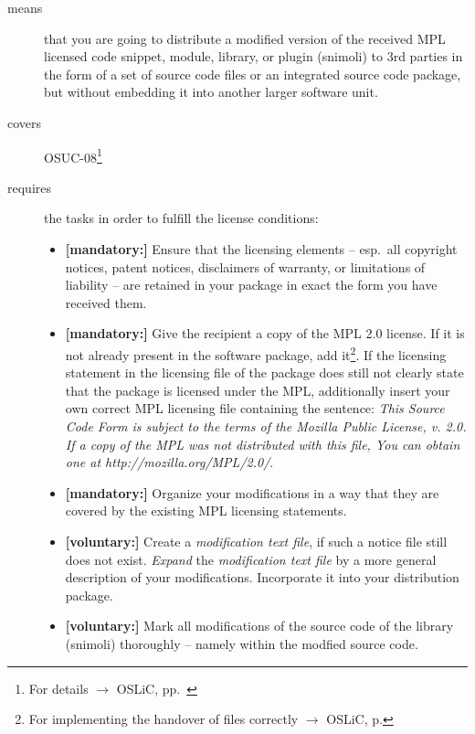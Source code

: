 \begin{description}
\item[means] that you are going to distribute a modified version of the received
MPL licensed code snippet, module, library, or plugin (snimoli) to 3rd
parties in the form of a set of source code files or an integrated source code
package, but without embedding it into another larger software unit.
\item[covers] OSUC-08\footnote{For details $\rightarrow$ OSLiC, pp.\ \pageref{OSUC-08-DEF}}
\item[requires] the tasks in order to fulfill the license conditions:
\begin{itemize}

  \item \textbf{[mandatory:]} Ensure that the licensing elements -- esp.\ all
  copyright notices, patent notices, disclaimers of warranty, or limitations of
  liability -- are retained in your package in exact the form you have received
  them.
  
  \item \textbf{[mandatory:]} Give the recipient a copy of the MPL 2.0 license.
  If it is not already present in the software package, add it\footnote{For
  implementing the handover of files correctly $\rightarrow$ OSLiC, p.
  \pageref{DistributingFilesHint}}. If the licensing statement in the licensing
  file of the package does still not clearly state that the package is licensed
  under the MPL, additionally insert your own correct MPL licensing file
  containing the sentence: \emph{This Source Code Form is subject to the terms
  of the Mozilla Public License, v. 2.0. If a copy of the MPL was not
  distributed with this file, You can obtain one at
  http://mozilla.org/MPL/2.0/}.
  
  \item \textbf{[mandatory:]} Organize your modifications in a way that they are
  covered by the existing MPL licensing statements.
  
  \item \textbf{[voluntary:]} Create a \emph{modification text file}, if such a
  notice file still does not exist. \emph{Expand} the \emph{modification text
  file} by a more general description of your modifications. Incorporate it into
  your distribution package.

  \item \textbf{[voluntary:]} Mark all modifications of the source code of the
  library (snimoli) thoroughly -- namely within
  the modfied source code.
  

\end{itemize}
\end{description}
